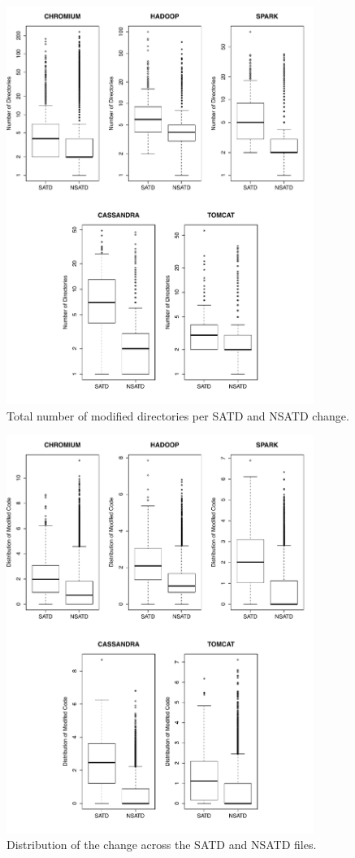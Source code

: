 \begin{figure}[!hp]
	\centering
	\includegraphics[width=100mm]{figures/chapter3/number_of_directories}
	\caption{Total number of modified directories per SATD and NSATD change.}
	\label{figure:number_of_directories}
\end{figure}


\begin{figure}[!hp]
	\centering
	\includegraphics[width=100mm]{figures/chapter3/entropy_for_all_projects}
	\caption{Distribution of the change across the SATD and NSATD files.}
	\label{figure:mtdocatdf}
\end{figure}


